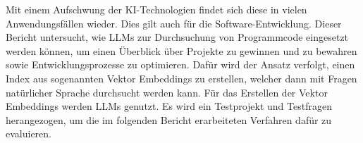 \documentclass[../main.tex]{subfiles}
\begin{document}
Mit einem Aufschwung der KI-Technologien findet sich diese in vielen Anwendungsfällen wieder.
Dies gilt auch für die Software-Entwicklung.
Dieser Bericht untersucht, wie \glspl{LLM} zur Durchsuchung von Programmcode eingesetzt werden können, um einen Überblick über Projekte zu gewinnen und zu bewahren sowie Entwicklungsprozesse zu optimieren.
Dafür wird der Ansatz verfolgt, einen Index aus sogenannten Vektor Embeddings zu erstellen, welcher dann mit Fragen natürlicher Sprache durchsucht werden kann.
Für das Erstellen der Vektor Embeddings werden \glspl{LLM} genutzt.
Es wird ein Testprojekt und Testfragen herangezogen, um die im folgenden Bericht erarbeiteten Verfahren dafür zu evaluieren.
\end{document}

